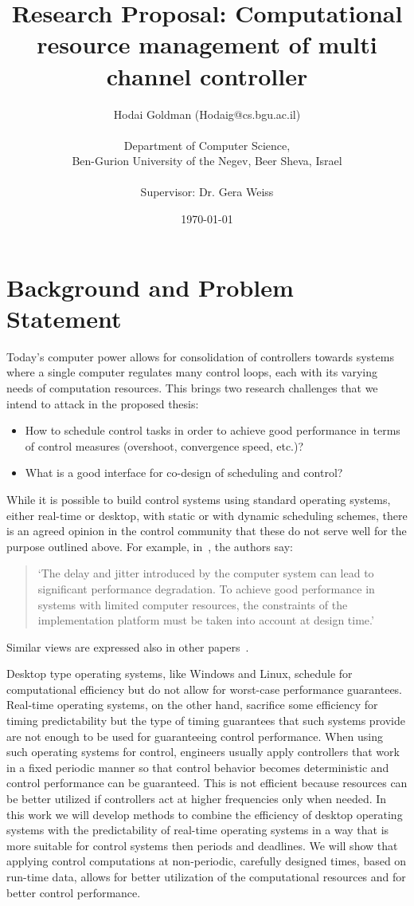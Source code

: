 \documentclass[11pt]{article}
\author{Hodai Goldman (Hodaig@cs.bgu.ac.il) \\ \\Department of Computer Science, \\Ben-Gurion University of the Negev, Beer Sheva, Israel \\ \\Supervisor: Dr. Gera Weiss}
\date{\today}
\title{Research Proposal: Computational resource management of multi channel controller}
\begin{document}
\begin{titlepage}
\maketitle
\end{titlepage}



\section{Background and Problem Statement}
\label{sec:Background}
Today's computer power allows for consolidation of controllers towards systems where a single computer regulates many control loops, each with its varying needs of computation resources.
This brings two research challenges that we intend to attack in the proposed thesis:
\begin{itemize}
	\item How to schedule control tasks in order to achieve good performance in terms of control measures (overshoot, convergence speed, etc.)?
	\item What is a good interface for co-design of scheduling and control?
\end{itemize}

While it is possible to build control systems using standard operating systems, either real-time or desktop, with static or with dynamic scheduling schemes, there is an agreed opinion in the control community that these do not serve well for the purpose outlined above. For example, in~\cite{Cervin}, the authors say: 
\begin{quotation}
`The delay and jitter introduced by the computer system can lead to significant performance degradation. To achieve good performance in systems with limited computer resources, the constraints of the implementation platform must be taken into account at design time.'
\end{quotation}
Similar views are expressed also in other papers~\cite{RTComposer,Shlomo,UPenn-Pant}.
 
Desktop type operating systems, like Windows and Linux, schedule for computational efficiency but do not allow for worst-case performance guarantees. Real-time operating systems, on the other hand, sacrifice some efficiency for timing predictability but the type of timing guarantees that such systems provide are not enough to be used for guaranteeing control performance. When using such operating systems for control, engineers usually apply controllers that work in a fixed periodic manner so that control behavior becomes deterministic and control performance can be guaranteed. This is not efficient because resources can be better utilized if controllers act at higher frequencies only when needed. 
In this work we will develop methods to combine the efficiency of desktop operating systems with the predictability of real-time operating systems in a way that is more suitable for control systems then periods and deadlines. We will show that applying control computations at non-periodic, carefully designed times, based on run-time data, allows for better utilization of the computational resources and for better control performance.   
\end{document}
